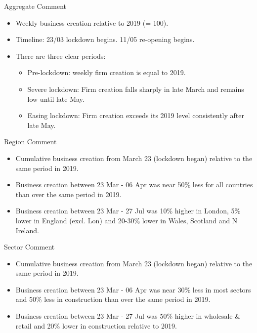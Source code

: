 \documentclass{beamer}
\begin{document}
\begin{frame}{}
\begin{columns}[t]
      \begin{column}{.49\linewidth}
        \begin{block}{Aggregate Comment}
          \begin{itemize}
          \item Weekly business creation relative to 2019 (= 100). 
          \item \alert{Timeline:} 23/03 lockdown begins. 11/05 re-opening begins.
          \item There are three clear periods:
          \begin{itemize}
              \item \alert{Pre-lockdown:} weekly firm creation is equal to 2019. 
              \item \alert{Severe lockdown:} Firm creation falls sharply in late March and remains low until late May.
              \item \alert{Easing lockdown:} Firm creation exceeds its 2019 level consistently after late May.
          \end{itemize}
          \end{itemize}
\vspace{0.3cm}
        \end{block}

        \begin{block}{Region Comment}
          \begin{itemize}
          \item Cumulative business creation from March 23 (lockdown began) relative to the same period in 2019.
          \item Business creation between 23 Mar - 06 Apr was near 50\% less for all countries than over the same period in 2019. 
          \item Business creation between 23 Mar - 27 Jul was 10\% higher in London, 5\% lower in England (excl. Lon) and 20-30\% lower in Wales, Scotland and N Ireland.
          \end{itemize}
\vspace{2.4cm}
        \end{block}
        
        \begin{block}{Sector Comment}
          \begin{itemize}
          \item Cumulative business creation from March 23 (lockdown began) relative to the same period in 2019.
          \item Business creation between 23 Mar - 06 Apr was near 30\% less in most sectors and 50\% less in construction than over the same period in 2019.
          \item Business creation between 23 Mar - 27 Jul was 50\% higher in wholesale \& retail and 20\% lower in construction relative to 2019.
          \end{itemize}
\vspace{1.25cm}
        \end{block}


\end{column}
\end{columns}
\end{frame}
\end{document}
